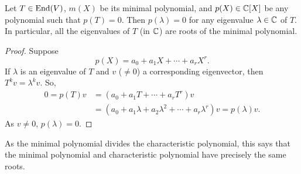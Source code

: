 		\begin{fprop}
			Let $T \in \operatorname{End}(V)$, $m(X)$ be its minimal polynomial, and $p(X) \in \mathbb{C}[X]$ be any polynomial such that $p(T) = 0$. Then $p(\lambda) = 0$ for any eigenvalue $\lambda \in \mathbb{C}$ of $T$. In particular, all the eigenvalues of $T$ (in $\mathbb{C}$) are roots of the minimal polynomial.
		\end{fprop}
		\begin{proof}
			Suppose
			\[ p(X) = a_0 + a_1 X + \cdots + a_r X^r. \]
			If $\lambda$ is an eigenvalue of $T$ and $v$ ($\ne 0$) a corresponding eigenvector, then $T^k v = \lambda^k v$. So,
			\begin{align*}
				0 = p(T)v &= \left( a_0 + a_1 T + \cdots + a_r T^r \right) v \\
					&= \left(a_0 + a_1 \lambda + a_2 \lambda^2 + \cdots + a_r \lambda^r\right) v = p(\lambda) v. 
			\end{align*}
			As $v \ne 0$, $p(\lambda) = 0$.
		\end{proof}

		As the minimal polynomial divides the characteristic polynomial, this says that the minimal polynomial and characteristic polynomial have precisely the same roots. 

